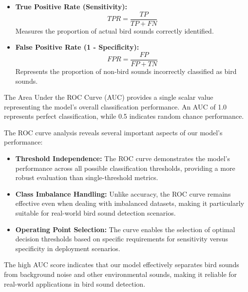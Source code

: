       \begin{itemize}
      \item \textbf{True Positive Rate (Sensitivity):}
      \begin{equation}
            TPR = \frac{TP}{TP + FN}
      \end{equation}
      Measures the proportion of actual bird sounds correctly identified.

      \item \textbf{False Positive Rate (1 - Specificity):}
      \begin{equation}
            FPR = \frac{FP}{FP + TN}
      \end{equation}
      Represents the proportion of non-bird sounds incorrectly classified as bird sounds.
      \end{itemize}
      The Area Under the ROC Curve (AUC) provides a single scalar value representing the model's overall classification performance. An AUC of 1.0 represents perfect classification, while 0.5 indicates random chance performance.

      The ROC curve analysis reveals several important aspects of our model's performance:

      \begin{itemize}
      \item \textbf{Threshold Independence:} The ROC curve demonstrates the model's performance across all possible classification thresholds, providing a more robust evaluation than single-threshold metrics.
      
      \item \textbf{Class Imbalance Handling:} Unlike accuracy, the ROC curve remains effective even when dealing with imbalanced datasets, making it particularly suitable for real-world bird sound detection scenarios.
      
      \item \textbf{Operating Point Selection:} The curve enables the selection of optimal decision thresholds based on specific requirements for sensitivity versus specificity in deployment scenarios.
      \end{itemize}

      The high AUC score indicates that our model effectively separates bird sounds from background noise and other environmental sounds, making it reliable for real-world applications in bird sound detection.



\newpage
